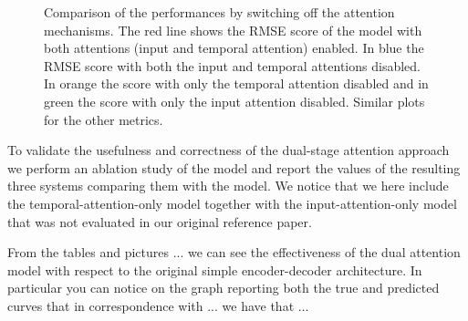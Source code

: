 \documentclass{article}
\begin{document}
\begin{figure}[h]
  \centering
  \caption{Comparison of the performances by switching off the attention
  mechanisms. The red line shows the RMSE score of the model with both
  attentions (input and temporal attention) enabled. In blue the RMSE score
  with both the input and temporal attentions disabled. In orange the score
  with only the temporal attention disabled and in green the score with
  only the input attention disabled. Similar plots for the other metrics.}
\end{figure}

To validate the usefulness and correctness of the dual-stage attention approach
we
perform an ablation study of the model and report the values of the resulting
three systems comparing them with the model. We notice that we here include the
temporal-attention-only model together with the input-attention-only model that
was not evaluated in our original reference paper.

From the tables and pictures ...
we can see the effectiveness of the dual attention model with respect to the
original simple encoder-decoder architecture. In particular you can notice on
the graph reporting both the true and predicted curves that in correspondence
with ... we have that ...
\end{document}
